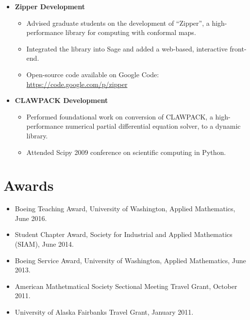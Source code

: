 \documentclass{article}
\begin{document}
\begin{itemize}
  \setlength{\itemsep}{0pt}
  \item {\bf Zipper Development}
    \begin{itemize}
    \item Advised graduate students on the development of ``Zipper'', a
      high-performance library for computing with conformal maps.
      \item Integrated the library into Sage and added a web-based, interactive
        front-end.
      \item Open-source code available on Google Code:
        \url{https://code.google.com/p/zipper}
    \end{itemize}
  \item {\bf CLAWPACK Development}
    \begin{itemize}
    \item Performed foundational work on conversion of CLAWPACK, a
      high-performance numerical partial differential equation solver, to a
      dynamic library.
    \item Attended Scipy 2009 conference on scientific computing in Python.
    \end{itemize}
\end{itemize}


\section*{Awards}

\begin{itemize}
  \setlength{\itemsep}{0pt}
  \item Boeing Teaching Award, University of Washington, Applied
    Mathematics, June 2016.
  \item Student Chapter Award, Society for Industrial and Applied Mathematics
    (SIAM), June 2014.
  \item Boeing Service Award, University of Washington, Applied
    Mathematics, June 2013.
  \item American Mathetmatical Society Sectional Meeting Travel Grant,
    October 2011.
  \item University of Alaska Fairbanks Travel Grant, January 2011.
\end{itemize}
\end{document}

